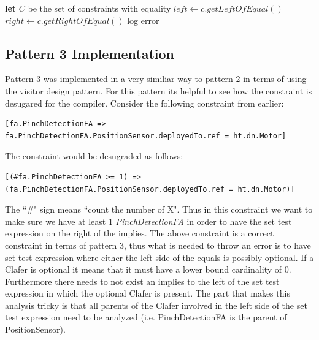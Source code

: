 \documentclass[10pt,oneside]{IEEEtran}
\begin{document}
\begin{algorithm}[H]
\caption{Finding missing ``.ref" of Clafer in Constraints}\label{alg:pattern2}
\begin{algorithmic}[1]
  \State \textbf{let} $C$ be the set of constraints with equality
    \State $left \gets c.getLeftOfEqual()$
    \State $right \gets c.getRightOfEqual()$
        \State log error
      \EndIf
    \EndIf
  \EndFor
\EndProcedure
\end{algorithmic}
\end{algorithm}

\subsection{Pattern 3 Implementation}
Pattern 3 was implemented in a very similiar way to pattern 2 in terms of using the visitor design pattern. For this pattern its helpful to see how the constraint is desugared for the compiler. Consider the following constraint from earlier:
\begin{lstlisting}[]
[fa.PinchDetectionFA => fa.PinchDetectionFA.PositionSensor.deployedTo.ref = ht.dn.Motor]
\end{lstlisting}
The constraint would be desugraded as follows:
\begin{lstlisting}[]
[(#fa.PinchDetectionFA >= 1) => (fa.PinchDetectionFA.PositionSensor.deployedTo.ref = ht.dn.Motor)]
\end{lstlisting}
The ``\#" sign means ``count the number of X". Thus in this constraint we want to make sure we have at least 1 \textit{PinchDetectionFA} in order to have the set test expression on the right of the implies. The above constraint is a correct constraint in terms of pattern 3, thus what is needed to throw an error is to have set test expression where either the left side of the equals is possibly optional. If a Clafer is optional it means that it must have a lower bound cardinality of 0. Furthermore there needs to not exist an implies to the left of the set test expression in which the optional Clafer is present. The part that makes this analysis tricky is that all parents of the Clafer involved in the left side of the set test expression need to be analyzed (i.e. PinchDetectionFA is the parent of PositionSensor).
\end{document}
